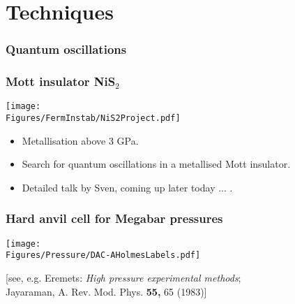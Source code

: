 \section{Techniques}
\begin{frame}[label=QuantOsc]
\frametitle{Quantum oscillations}




\end{frame}

\begin{frame}[label=NiS2-1]
\frametitle{Mott insulator NiS$_2$}
\centerline{\texttt{[image: \\Figures/FermInstab/NiS2Project.pdf]}}

\begin{itemize}


\item
Metallisation above 3 GPa.

\item 
Search for quantum oscillations in a metallised Mott insulator.

\item 
Detailed talk by Sven, coming up later today ... .

\end{itemize}
\end{frame}

\begin{frame}[label=Diamond anvil]
\frametitle{Hard anvil cell for Megabar pressures}

\texttt{[image: \\Figures/Pressure/DAC-AHolmesLabels.pdf]}


\begin{center} 
{\small [see, e.g. Eremets: {\em High pressure
    experimental methods}; \\ Jayaraman, A. Rev. Mod. Phys. {\bf
    55,} 65 (1983)] }
\end{center}
\end{frame}


